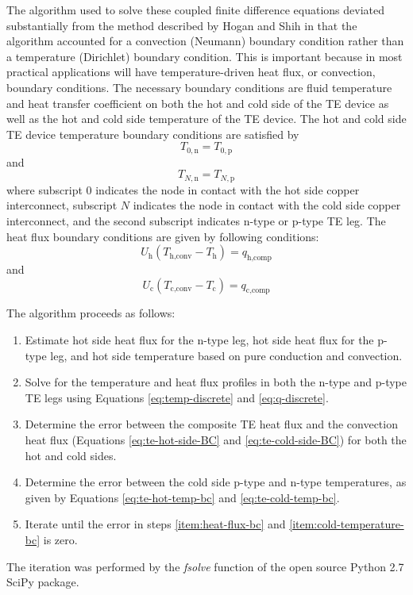 \documentclass[preprint,authoryear,12pt]{elsarticle}
\begin{document}
The algorithm used to solve these coupled finite difference equations
deviated substantially from the method described by Hogan and Shih
\cite{hogan_modeling_2006} in that the algorithm accounted for a
convection (Neumann) boundary condition rather than a temperature
(Dirichlet) boundary condition.  This is important because in most
practical applications will have temperature-driven heat flux, or
convection, boundary conditions.  The necessary boundary conditions
are fluid temperature and heat transfer coefficient on both the hot
and cold side of the TE device as well as the hot and cold side
temperature of the TE device.  The hot and cold side TE device
temperature boundary conditions are satisfied by
\begin{equation}
  \label{eq:te-hot-temp-bc}
  T_{0,\text{n}} = T_{0,\text{p}}
\end{equation}
and
\begin{equation}
  \label{eq:te-cold-temp-bc}
  T_{N,\text{n}} = T_{N,\text{p}}
\end{equation}
where subscript 0 indicates the node in contact with the hot side
copper interconnect, subscript $N$ indicates the node in contact with
the cold side copper interconnect, and the second subscript indicates
n-type or p-type TE leg. The heat flux boundary conditions are given
by following conditions:
\begin{equation}
  \label{eq:te-hot-side-BC}
  U_{\text{h}} \left( T_{\text{h,conv}} - T_{\text{h}} \right) =
  q_{\text{h,comp}} 
\end{equation}
and
\begin{equation}
  \label{eq:te-cold-side-BC}
  U_{\text{c}} \left( T_{\text{c,conv}} - T_{\text{c}} \right) =
  q_{\text{c,comp}} 
\end{equation}

The algorithm proceeds as follows:
\begin{enumerate}
\item Estimate hot side heat flux for the n-type leg, hot side heat
  flux for the p-type leg, and hot side temperature based on pure
  conduction and convection.
\item Solve for the temperature and heat flux profiles in both the
  n-type and p-type TE legs using Equations \ref{eq:temp-discrete}
  and \ref{eq:q-discrete}.
\item Determine the error between the composite TE heat flux and the
  convection heat flux (Equations \ref{eq:te-hot-side-BC} and
  \ref{eq:te-cold-side-BC}) \label{item:heat-flux-bc} for both the hot
  and cold sides.
\item Determine the error between the cold side p-type and n-type
  temperatures, as given by Equations \ref{eq:te-hot-temp-bc} and
  \ref{eq:te-cold-temp-bc}.  \label{item:cold-temperature-bc}
\item Iterate until the error in steps \ref{item:heat-flux-bc} and
  \ref{item:cold-temperature-bc} is zero.
\end{enumerate}
The iteration was performed by the \emph{fsolve} function of the open
source Python 2.7 SciPy package.
\end{document}
